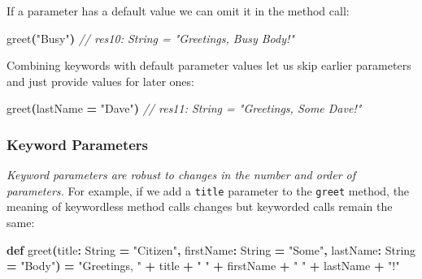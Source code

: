 \documentclass[11pt,a5paper,]{book}
\newenvironment{Shaded}{\begin{snugshade}}{\end{snugshade}}
\newcommand{\CommentTok}[1]{\textcolor[rgb]{0.56,0.35,0.01}{\textit{#1}}}
\newcommand{\ExtensionTok}[1]{#1}
\newcommand{\FunctionTok}[1]{\textcolor[rgb]{0.00,0.00,0.00}{#1}}
\newcommand{\KeywordTok}[1]{\textcolor[rgb]{0.13,0.29,0.53}{\textbf{#1}}}
\newcommand{\NormalTok}[1]{#1}
\newcommand{\OperatorTok}[1]{\textcolor[rgb]{0.81,0.36,0.00}{\textbf{#1}}}
\newcommand{\StringTok}[1]{\textcolor[rgb]{0.31,0.60,0.02}{#1}}
\begin{document}
If a parameter has a default value we can omit it in the method call:

\begin{Shaded}
\begin{Highlighting}[]
\FunctionTok{greet}\OperatorTok{(}\StringTok{"Busy"}\OperatorTok{)}
\CommentTok{// res10: String = "Greetings, Busy Body!"}
\end{Highlighting}
\end{Shaded}

Combining keywords with default parameter values let us skip earlier
parameters and just provide values for later ones:

\begin{Shaded}
\begin{Highlighting}[]
\FunctionTok{greet}\OperatorTok{(}\NormalTok{lastName }\OperatorTok{=} \StringTok{"Dave"}\OperatorTok{)}
\CommentTok{// res11: String = "Greetings, Some Dave!"}
\end{Highlighting}
\end{Shaded}

\hypertarget{keyword-parameters}{%
\subsubsection*{Keyword Parameters}\label{keyword-parameters}}

\emph{Keyword parameters are robust to changes in the number and order
of parameters.} For example, if we add a \texttt{title} parameter to the
\texttt{greet} method, the meaning of keywordless method calls changes
but keyworded calls remain the same:

\begin{Shaded}
\begin{Highlighting}[]
\KeywordTok{def} \FunctionTok{greet}\OperatorTok{(}\NormalTok{title}\OperatorTok{:} \ExtensionTok{String} \OperatorTok{=} \StringTok{"Citizen"}\OperatorTok{,}\NormalTok{ firstName}\OperatorTok{:} \ExtensionTok{String} \OperatorTok{=} \StringTok{"Some"}\OperatorTok{,}\NormalTok{ lastName}\OperatorTok{:} \ExtensionTok{String} \OperatorTok{=} \StringTok{"Body"}\OperatorTok{)} \OperatorTok{=}
  \StringTok{"Greetings, "} \OperatorTok{+}\NormalTok{ title }\OperatorTok{+} \StringTok{" "} \OperatorTok{+}\NormalTok{ firstName }\OperatorTok{+} \StringTok{" "} \OperatorTok{+}\NormalTok{ lastName }\OperatorTok{+} \StringTok{"!"}
\end{Highlighting}
\end{Shaded}
\end{document}
